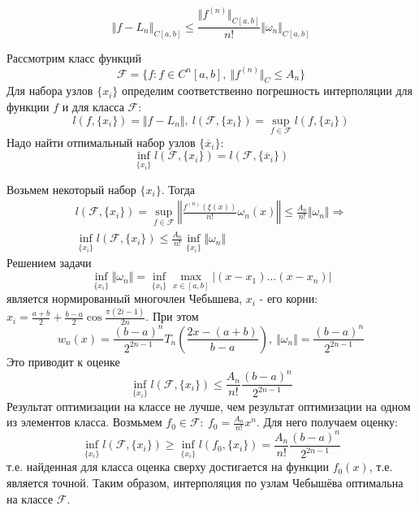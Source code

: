 \begin{ticket}
\begin{corollary}
    $$\left\Vert f-L_n\right\Vert_{C[a,b]}\leq\frac{\Vert f^{(n)}\Vert_{C[a,b]}}{n!}\Vert\omega_n\Vert_{C[a,b]} $$
  \end{corollary}
  \begin{task}
    Рассмотрим класс функций $$\mathcal{F}=\{f:f\in C^n[a,b],\ \Vert f^{(n)}\Vert_C\leq A_n\}$$
    Для набора узлов $\{x_i\}$ определим соответственно погрешность интерполяции для функции $f$ и для класса $\mathcal{F}$:
    $$l(f, \{x_i\})=\Vert f-L_n\Vert,\ l(\mathcal{F}, \{x_i\})=\sup_{f\in\mathcal{F}}l(f,\{x_i\})$$
    Надо найти отпимальный набор узлов $\{\overline{x}_i\}$:
    $$\inf_{\{x_i\}}l(\mathcal{F}, \{x_i\})=l(\mathcal{F}, \{\overline{x}_i\})$$
  \end{task}
  Возьмем некоторый набор $\{x_i\}$. Тогда
  \begin{align*}
    l(\mathcal{F}, \{x_i\})=\sup_{f\in\mathcal{F}}\left\Vert\frac{f^{(n)}(\xi(x))}{n!}\omega_n(x)\right\Vert\leq\frac{A_n}{n!}\Vert\omega_n\Vert\Rightarrow \\
    \inf_{\{x_i\}}l(\mathcal{F}, \{x_i\})\leq\frac{A_n}{n!}\inf_{\{x_i\}}\Vert\omega_n\Vert
  \end{align*}
  Решением задачи
  $$\inf_{\{x_i\}}\Vert\omega_n\Vert=\inf_{\{x_i\}}\max_{x\in[a,b]}|(x-x_1)\ldots(x-x_n)|$$
  является нормированный многочлен Чебышева, $x_i$ - его корни: $x_i=\frac{a+b}{2}+\frac{b-a}{2}\cos\frac{\pi(2i-1)}{2n}$. При этом
  $$w_n(x)=\frac{(b-a)^n}{2^{2n-1}}T_n\left(\frac{2x-(a+b)}{b-a}\right),\ \Vert \omega_n\Vert=\frac{(b-a)^n}{2^{2n-1}}$$
  Это приводит к оценке
  $$\inf_{\{x_i\}}l(\mathcal{F}, \{x_i\})\leq\frac{A_n}{n!}\frac{(b-a)^n}{2^{2n-1}}$$
  Результат оптимизации на классе не лучше, чем результат оптимизации на одном из элементов класса.
  Возмьмем $f_0\in\mathcal{F}:\ f_0=\frac{A_n}{n!}x^n$. Для него получаем оценку:
  $$\inf_{\{x_i\}}l(\mathcal{F}, \{x_i\})\geq\inf_{\{x_i\}}l(f_0, \{x_i\})=\frac{A_n}{n!}\frac{(b-a)^n}{2^{2n-1}}$$
  т.е. найденная для класса оценка сверху достигается на функции $f_0(x)$, т.е. является точной.
  Таким образом, интерполяция по узлам Чебышёва оптимальна на классе $\mathcal{F}$.
\end{ticket}
